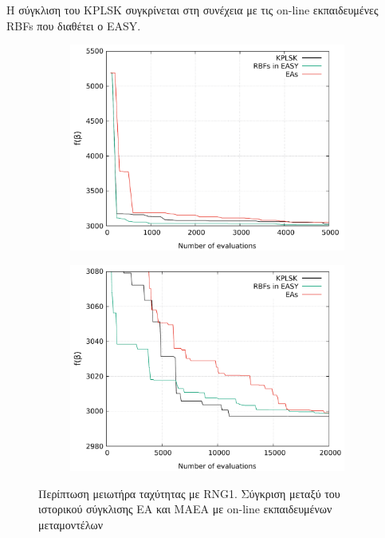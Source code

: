 \documentclass[twoside, 12pt,notitlepage]{report}
\begin{document}
\begin{enumerate}
H σύγκλιση του KPLSK συγκρίνεται στη συνέχεια με τις on-line 
εκπαιδευμένες RBFs που διαθέτει ο EASY.

\begin{figure}[h!]
\centering
	\begin{subfigure}[b]{0.47\textwidth}
	\centering
	\includegraphics[width=\textwidth, height=0.85\textwidth, 
	scale=1]{speed_reducer_online.pdf}   
	\end{subfigure}
	\hfill
	\begin{subfigure}[b]{0.47\textwidth}
	\centering
	\includegraphics[width=\textwidth, height=0.85\textwidth, 
	scale=1]{speed_reducer_online2.pdf}   
	\end{subfigure}
\caption{Περίπτωση μειωτήρα ταχύτητας με RNG1. Σύγκριση μεταξύ του 
ιστορικού σύγκλισης EA και ΜΑΕΑ με on-line εκπαιδευμένων 
μεταμοντέλων} 
\end{figure}


\end{enumerate}
\end{document}
